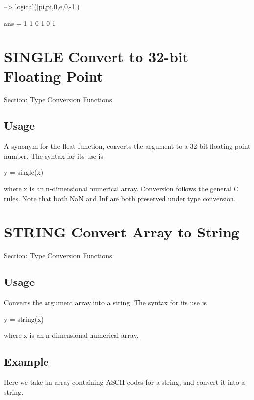 \begin{DoxyVerbInclude}
--> logical([pi,pi,0,e,0,-1])

ans = 
 1 1 0 1 0 1 
\end{DoxyVerbInclude}
 \hypertarget{typecast_single}{}\section{S\-I\-N\-G\-L\-E Convert to 32-\/bit Floating Point}\label{typecast_single}
Section\-: \hyperlink{sec_typecast}{Type Conversion Functions} \hypertarget{vtkwidgets_vtkxyplotwidget_Usage}{}\subsection{Usage}\label{vtkwidgets_vtkxyplotwidget_Usage}
A synonym for the {\ttfamily float} function, converts the argument to a 32-\/bit floating point number. The syntax for its use is \begin{DoxyVerb}   y = single(x)
\end{DoxyVerb}
 where {\ttfamily x} is an {\ttfamily n}-\/dimensional numerical array. Conversion follows the general C rules. Note that both {\ttfamily Na\-N} and {\ttfamily Inf} are both preserved under type conversion. \hypertarget{typecast_string}{}\section{S\-T\-R\-I\-N\-G Convert Array to String}\label{typecast_string}
Section\-: \hyperlink{sec_typecast}{Type Conversion Functions} \hypertarget{vtkwidgets_vtkxyplotwidget_Usage}{}\subsection{Usage}\label{vtkwidgets_vtkxyplotwidget_Usage}
Converts the argument array into a string. The syntax for its use is \begin{DoxyVerb}   y = string(x)
\end{DoxyVerb}
 where {\ttfamily x} is an {\ttfamily n}-\/dimensional numerical array. \hypertarget{variables_struct_Example}{}\subsection{Example}\label{variables_struct_Example}
Here we take an array containing A\-S\-C\-I\-I codes for a string, and convert it into a string.


